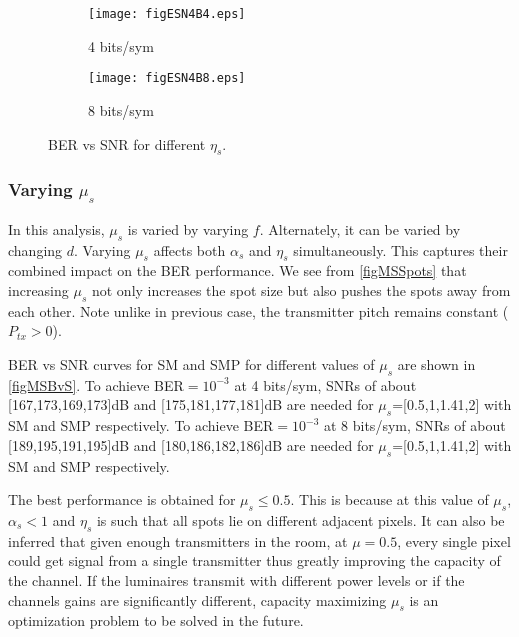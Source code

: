 \begin{figure}
	\centering
		\begin{subfigure}{\textwidth}
			\centering
			\texttt{[image: figESN4B4.eps]}
			\caption{4 bits/sym}
			\label{figESN4B4}
		\end{subfigure}
		
		\begin{subfigure}{\textwidth}
			\centering
			\texttt{[image: figESN4B8.eps]}
			\caption{8 bits/sym}
			\label{figESN4B8}
		\end{subfigure}
		
		\caption{BER vs SNR for different $\eta_{s}$.}
		\label{figESBvS}
\end{figure}
\newpage
\subsubsection{Varying $\mu_{s}$}
\label{subsubsec:osmResultsMu}
In this analysis, $\mu_{s}$ is varied by varying $f$. Alternately, it can be varied by changing $d$. Varying $\mu_{s}$ affects both $\alpha_{s}$ and $\eta_{s}$ simultaneously. This captures their combined impact on the BER performance. We see from \figurename{ \ref{figMSSpots}} that increasing $\mu_{s}$ not only increases the spot size but also pushes the spots away from each other. Note unlike in previous case, the transmitter pitch remains constant ($P_{tx}>0$).

BER vs SNR curves for SM and SMP for different values of $\mu_{s}$ are shown in \figurename{ \ref{figMSBvS}}. To achieve BER$=10^{-3}$ at 4 bits/sym, SNRs of about [167,173,169,173]dB and [175,181,177,181]dB are needed for $\mu_{s}$=[0.5,1,1.41,2] with SM and SMP respectively. To achieve BER$=10^{-3}$ at 8 bits/sym, SNRs of about [189,195,191,195]dB and [180,186,182,186]dB are needed for $\mu_{s}$=[0.5,1,1.41,2] with SM and SMP respectively.

The best performance is obtained for $\mu_{s}\leq 0.5$. This is because at this value of $\mu_{s}$, $\alpha_{s}<1$ and $\eta_{s}$ is such that all spots lie on different adjacent pixels. It can also be inferred that given enough transmitters in the room, at $\mu=0.5$, every single pixel could get signal from a single transmitter thus greatly improving the capacity of the channel. If the luminaires transmit with different power levels or if the channels gains are significantly different, capacity maximizing $\mu_{s}$ is an optimization problem to be solved in the future.

